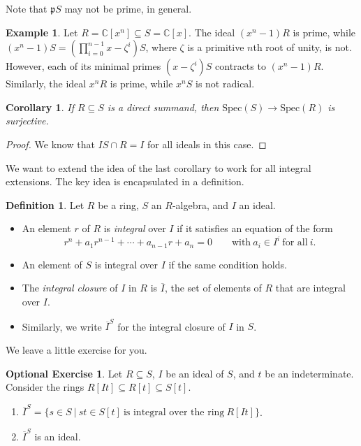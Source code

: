 \documentclass{amsart}[12pt]
\newcommand{\CC}{\mathbb{C}}
\newcommand{\p}{{\mathfrak p}}
\numberwithin{equation}{section}
\theoremstyle{plain} %
\newtheorem{corollary}[equation]{Corollary}
\theoremstyle{definition}
\newtheorem{definition}[equation]{Definition}
\newtheorem{example}[equation]{Example}
\newtheorem{exer}[equation]{Optional Exercise}
\theoremstyle{remark}
\newcommand{\Spec}{\mathrm{Spec}}
\begin{document}
Note that $\p S$ may not be prime, in general.

\begin{example}
Let $R=\CC[x^n] \subseteq S=\CC[x]$. The ideal $(x^n-1) R$ is prime, while $(x^n-1) S = (\prod_{i=0}^{n-1} x - \zeta^i) S$, where $\zeta$ is a primitive $n$th root of unity, is not. However, each of its minimal primes $(x-\zeta^i)S$ contracts to $(x^n-1)R$. Similarly, the ideal $x^n R$ is prime, while $x^n S$ is not radical.
\end{example}



\begin{corollary} If $R\subseteq S$ is a direct summand, then $\Spec(S) \to \Spec(R)$ is surjective.
\end{corollary}
\begin{proof} We know that $I S \cap R = I$ for all ideals in this case.
\end{proof}

We want to extend the idea of the last corollary to work for all integral extensions. The key idea is encapsulated in a definition.

\begin{definition} Let $R$ be a ring, $S$ an $R$-algebra, and $I$ an ideal. 
	\begin{itemize}
		\item An element $r$ of $R$ is \emph{integral} over $I$  if it satisfies an equation of the form
		\[ r^n + a_1 r^{n-1} + \cdots + a_{n-1} r + a_n = 0 \qquad \text{with} \ a_i \in I^i \ \text{for all} \  i.\]
		\item An element of $S$ is integral over $I$ if the same condition holds.
		\item The \emph{integral closure} of $I$ in $R$ is $\overline{I}$, the set of elements of $R$ that are integral over $I$.
		\item Similarly, we write $\overline{I}^S$ for the integral closure of $I$ in $S$.
	\end{itemize}
\end{definition}

We leave a little exercise for you.

\begin{exer} Let $R\subseteq S$, $I$ be an ideal of $S$, and $t$ be an indeterminate. Consider the rings $R[It]\subseteq R[t] \subseteq S[t]$.
\begin{enumerate}
	\item $\overline{I}^S =\{ s \in S \ | \ st\in S[t] \ \text{is integral over the ring} \ R[It]\}$.
	\item $\overline{I}^S$ is an ideal.
\end{enumerate}
\end{exer}
\end{document}
